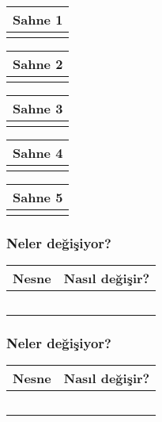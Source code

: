 \documentclass[12pt, a4paper]{article}
\begin{document}
\noindent
\begin{tabular}{| p{16.5cm}  |  }
\hline			
Sahne 1\\
\hline
 \\[50ex]
\hline  
\end{tabular}

\vspace{5ex}
\noindent
\begin{tabular}{| p{16.5cm}  |  }
\hline			
Sahne 2\\
\hline
 \\[50ex]
\hline  
\end{tabular}

\vspace{5ex}
\noindent
\begin{tabular}{| p{16.5cm}  |  }
\hline			
Sahne 3\\
\hline
 \\[50ex]
\hline  
\end{tabular}

\vspace{5ex}
\noindent
\begin{tabular}{| p{16.5cm}  |  }
\hline			
Sahne 4\\
\hline
 \\[50ex]
\hline  
\end{tabular}

\vspace{5ex}
\noindent
\begin{tabular}{| p{16.5cm}  |  }
\hline			
Sahne 5\\
\hline
 \\[50ex]
\hline  
\end{tabular}

\vspace{5ex}

\subsubsection*{Neler değişiyor?}
\begin{tabular}{| p{4cm} | p{11cm} |  }
\hline			
Nesne&Nasıl değişir?\\
\hline
& \\[6ex]
\hline  
& \\[6ex]
\hline  
& \\[6ex]
\hline  
& \\[6ex]
\hline  
& \\[6ex]
\hline  
\end{tabular}


\subsubsection*{Neler değişiyor?}
\begin{tabular}{| p{4cm} | p{11cm} |  }
\hline			
Nesne&Nasıl değişir?\\
\hline
& \\[6ex]
\hline  
& \\[6ex]
\hline  
& \\[6ex]
\hline  
& \\[6ex]
\hline  
& \\[6ex]
\hline  
\end{tabular}
\end{document}
